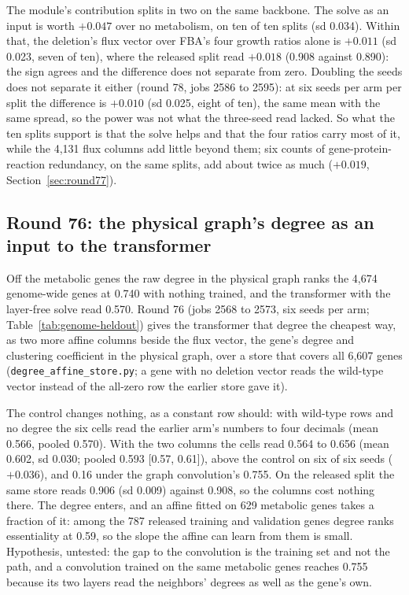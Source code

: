 The module's contribution splits in two on the same backbone. The solve as an input is
worth $+0.047$ over no metabolism, on ten of ten splits (sd 0.034). Within that, the
deletion's flux vector over FBA's four growth ratios alone is $+0.011$ (sd 0.023, seven
of ten), where the released split read $+0.018$ (0.908 against 0.890): the sign agrees
and the difference does not separate from zero. Doubling the seeds does not separate it
either (round 78, jobs 2586 to 2595): at six seeds per arm per split the difference is
$+0.010$ (sd 0.025, eight of ten), the same mean with the same spread, so the power was
not what the three-seed read lacked. So what the ten splits support is that the solve
helps and that the four ratios carry most of it, while the 4,131 flux columns add
little beyond them; six counts of gene-protein-reaction redundancy, on the same splits,
add about twice as much ($+0.019$, Section~\ref{sec:round77}).

\subsection{Round 76: the physical graph's degree as an input to the transformer}
\label{sec:round76}

Off the metabolic genes the raw degree in the physical graph ranks the 4,674 genome-wide
genes at 0.740 with nothing trained, and the transformer with the layer-free solve read
0.570. Round 76 (jobs 2568 to 2573, six seeds per arm; Table~\ref{tab:genome-heldout})
gives the transformer that degree the cheapest way, as two more affine columns beside
the flux vector, the gene's degree and clustering coefficient in the physical graph,
over a store that covers all 6,607 genes (\texttt{degree\_affine\_store.py}; a gene
with no deletion vector reads the wild-type vector instead of the all-zero row the
earlier store gave it).

The control changes nothing, as a constant row should: with wild-type rows and no degree
the six cells read the earlier arm's numbers to four decimals (mean 0.566, pooled 0.570).
With the two columns the cells read 0.564 to 0.656 (mean 0.602, sd 0.030; pooled 0.593
[0.57, 0.61]), above the control on six of six seeds ($+0.036$), and 0.16 under the
graph convolution's 0.755. On the released split the same store reads 0.906 (sd 0.009)
against 0.908, so the columns cost nothing there. The degree enters, and an affine
fitted on 629 metabolic genes takes a fraction of it: among the 787 released training
and validation genes degree ranks essentiality at 0.59, so the slope the affine can learn from them is small. Hypothesis,
untested: the gap to the convolution is the training set and not the path, and a
convolution trained on the same metabolic genes reaches 0.755 because its two layers
read the neighbors' degrees as well as the gene's own.

